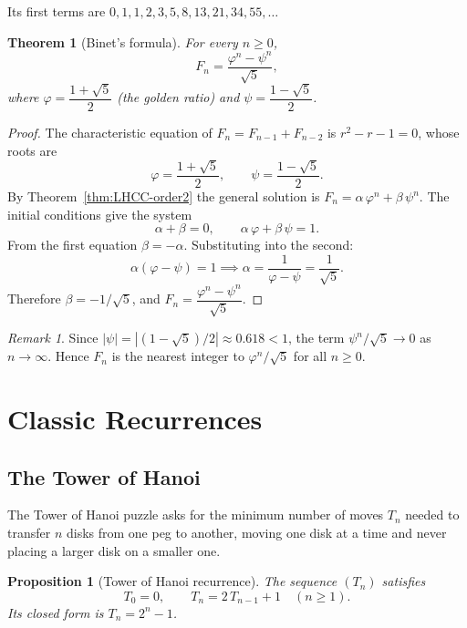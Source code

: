 \documentclass[12pt,a4paper,openany]{book}
\theoremstyle{definition}
\theoremstyle{plain}
\newtheorem{theorem}[definition]{Theorem}
\newtheorem{proposition}[definition]{Proposition}
\theoremstyle{remark}
\newtheorem{remark}[definition]{Remark}
\newcommand{\abs}[1]{\left|#1\right|}
\begin{document}
Its first terms are $0, 1, 1, 2, 3, 5, 8, 13, 21, 34, 55, \dots$

\begin{theorem}[Binet's formula]\label{thm:binet}
For every $n \ge 0$,
\[
   F_n = \frac{\varphi^n - \psi^n}{\sqrt{5}},
\]
where $\varphi = \dfrac{1+\sqrt{5}}{2}$ (the \emph{golden ratio})
and $\psi = \dfrac{1-\sqrt{5}}{2}$.
\end{theorem}

\begin{proof}
The characteristic equation of $F_n = F_{n-1} + F_{n-2}$ is
$r^2 - r - 1 = 0$, whose roots are
\[
   \varphi = \frac{1+\sqrt{5}}{2}, \qquad
   \psi   = \frac{1-\sqrt{5}}{2}.
\]
By Theorem~\ref{thm:LHCC-order2} the general solution is
$F_n = \alpha\, \varphi^n + \beta\, \psi^n$.
The initial conditions give the system
\[
   \alpha + \beta = 0, \qquad
   \alpha\, \varphi + \beta\, \psi = 1.
\]
From the first equation $\beta = -\alpha$.  Substituting into the second:
\[
   \alpha(\varphi - \psi) = 1
   \implies \alpha = \frac{1}{\varphi - \psi} = \frac{1}{\sqrt{5}}.
\]
Therefore $\beta = -1/\sqrt{5}$, and
$F_n = \dfrac{\varphi^n - \psi^n}{\sqrt{5}}$.
\end{proof}

\begin{remark}\label{rem:binet-approx}
Since $\abs{\psi} = \abs{(1-\sqrt{5})/2} \approx 0.618 < 1$,
the term $\psi^n / \sqrt{5} \to 0$ as $n \to \infty$.
Hence $F_n$ is the nearest integer to
$\varphi^n / \sqrt{5}$ for all $n \ge 0$.
\end{remark}

\section{Classic Recurrences}\label{sec:classic-rec}

\subsection{The Tower of Hanoi}\label{ssec:hanoi}

The Tower of Hanoi puzzle asks for the minimum number of moves $T_n$
needed to transfer $n$ disks from one peg to another, moving one disk at
a time and never placing a larger disk on a smaller one.

\begin{proposition}[Tower of Hanoi recurrence]\label{prop:hanoi}
The sequence $(T_n)$ satisfies
\[
   T_0 = 0, \qquad T_n = 2\, T_{n-1} + 1 \quad (n \ge 1).
\]
Its closed form is $T_n = 2^n - 1$.
\end{proposition}
\end{document}
